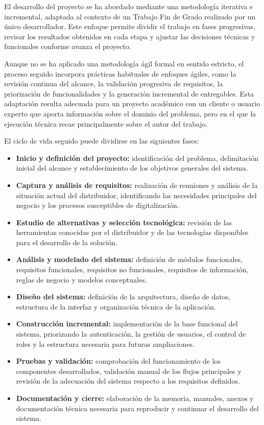 El desarrollo del proyecto se ha abordado mediante una metodología iterativa e incremental, adaptada al contexto de un Trabajo Fin de Grado realizado por un único desarrollador. Este enfoque permite dividir el trabajo en fases progresivas, revisar los resultados obtenidos en cada etapa y ajustar las decisiones técnicas y funcionales conforme avanza el proyecto.

Aunque no se ha aplicado una metodología ágil formal en sentido estricto, el proceso seguido incorpora prácticas habituales de enfoques ágiles, como la revisión continua del alcance, la validación progresiva de requisitos, la priorización de funcionalidades y la generación incremental de entregables. Esta adaptación resulta adecuada para un proyecto académico con un cliente o usuario experto que aporta información sobre el dominio del problema, pero en el que la ejecución técnica recae principalmente sobre el autor del trabajo.

El ciclo de vida seguido puede dividirse en las siguientes fases:

\begin{itemize}
    \item \textbf{Inicio y definición del proyecto:} identificación del problema, delimitación inicial del alcance y establecimiento de los objetivos generales del sistema.
    \item \textbf{Captura y análisis de requisitos:} realización de reuniones y análisis de la situación actual del distribuidor, identificando las necesidades principales del negocio y los procesos susceptibles de digitalización.
    \item \textbf{Estudio de alternativas y selección tecnológica:} revisión de las herramientas conocidas por el distribuidor y de las tecnologías disponibles para el desarrollo de la solución.
    \item \textbf{Análisis y modelado del sistema:} definición de módulos funcionales, requisitos funcionales, requisitos no funcionales, requisitos de información, reglas de negocio y modelos conceptuales.
    \item \textbf{Diseño del sistema:} definición de la arquitectura, diseño de datos, estructura de la interfaz y organización técnica de la aplicación.
    \item \textbf{Construcción incremental:} implementación de la base funcional del sistema, priorizando la autenticación, la gestión de usuarios, el control de roles y la estructura necesaria para futuras ampliaciones.
    \item \textbf{Pruebas y validación:} comprobación del funcionamiento de los componentes desarrollados, validación manual de los flujos principales y revisión de la adecuación del sistema respecto a los requisitos definidos.
    \item \textbf{Documentación y cierre:} elaboración de la memoria, manuales, anexos y documentación técnica necesaria para reproducir y continuar el desarrollo del sistema.
\end{itemize}


